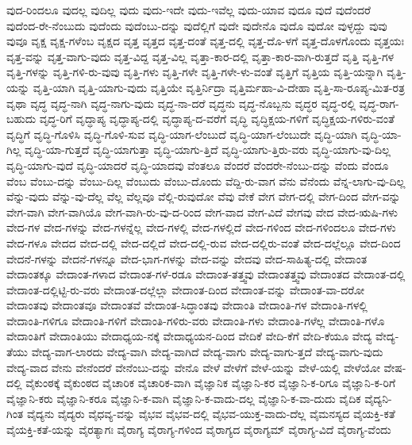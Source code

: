 {ವುದ-ರಿಂದಲೂ
ವುದಲ್ಲ
ವುದಿಲ್ಲ
ವುದು
ವುದು-ಇದೇ
ವುದು-ಇವೆಲ್ಲ
ವುದು-ಯಾವ
ವುದೂ
ವುದೆ
ವುದೆಂದರೆ
ವುದೆಂದ-ರೇ-ನೆಂಬುದು
ವುದೆಂದು
ವುದೆಂಬು-ದನ್ನು
ವುದೆಲ್ಲಿಗೆ
ವುದೇ
ವುದೇನೊ
ವುದೊ
ವುದೋ
ವುಳ್ಳದ್ದು
ವುವು
ವುವೂ
ವೃಕ್ಷ
ವೃಕ್ಷ-ಗಳೆಂಬ
ವೃಕ್ಷದ
ವೃತ್ತ
ವೃತ್ತದ
ವೃತ್ತ-ದಂತೆ
ವೃತ್ತ-ದಲ್ಲಿ
ವೃತ್ತ-ದೊ-ಳಗೆ
ವೃತ್ತ-ದೊಳಗೊಂದು
ವೃತ್ತಯಃ
ವೃತ್ತ-ವನ್ನು
ವೃತ್ತ-ವಾಗು-ವುದು
ವೃತ್ತ-ವಿದ್ದ
ವೃತ್ತ-ವಿಲ್ಲ
ವೃತ್ತಾ-ಕಾರ-ದಲ್ಲಿ
ವೃತ್ತಾ-ಕಾರ-ವಾಗಿ-ರುತ್ತದೆ
ವೃತ್ತಿ
ವೃತ್ತಿ-ಗಳ
ವೃತ್ತಿ-ಗಳನ್ನು
ವೃತ್ತಿ-ಗಳಿ-ರು-ವುವು
ವೃತ್ತಿ-ಗಳು
ವೃತ್ತಿ-ಗಳೇ
ವೃತ್ತಿ-ಗಳೇ-ಳು-ವಂತೆ
ವೃತ್ತಿಗೆ
ವೃತ್ತಿಯ
ವೃತ್ತಿ-ಯನ್ನಾಗಿ
ವೃತ್ತಿ-ಯನ್ನು
ವೃತ್ತಿ-ಯಾಗಿ
ವೃತ್ತಿ-ಯಾಗು-ವುದು
ವೃತ್ತಿಯೇ
ವೃತ್ತಿರ್ನಿದ್ರಾ
ವೃತ್ತಿರ್ಮಹಾ-ವಿ-ದೇಹಾ
ವೃತ್ತಿ-ಸಾ-ರೂಪ್ಯ-ಮಿತ-ರತ್ರ
ವೃಥಾ
ವೃದ್ಧ
ವೃದ್ಧ-ನಾಗಿ
ವೃದ್ಧ-ನಾಗು-ವುದು
ವೃದ್ಧ-ನಾ-ದರೆ
ವೃದ್ಧನು
ವೃದ್ಧ-ನೊಬ್ಬನು
ವೃದ್ಧರ
ವೃದ್ಧ-ರಲ್ಲಿ
ವೃದ್ಧ-ರಾಗ-ಬಹುದು
ವೃದ್ಧ-ರಿಗೆ
ವೃದ್ಧಾಪ್ಯ
ವೃದ್ಧಾಪ್ಯ-ದಲ್ಲಿ
ವೃದ್ಧಾಪ್ಯ-ದ-ವರೆಗೆ
ವೃದ್ಧಿ
ವೃದ್ಧಿಕ್ಷಯ-ಗಳಿಗೆ
ವೃದ್ಧಿಕ್ಷಯ-ಗಳಿರು-ವಂತೆ
ವೃದ್ಧಿಗೆ
ವೃದ್ಧಿ-ಗೊಳಿಸಿ
ವೃದ್ಧಿ-ಗೊಳಿ-ಸುವ
ವೃದ್ಧಿ-ಯಾಗ-ಲೆಂಬುದೆ
ವೃದ್ಧಿ-ಯಾಗ-ಲೆಂಬುದೇ
ವೃದ್ಧಿ-ಯಾಗಿ
ವೃದ್ಧಿ-ಯಾ-ಗಿಲ್ಲ
ವೃದ್ಧಿ-ಯಾ-ಗುತ್ತದೆ
ವೃದ್ಧಿ-ಯಾಗುತ್ತಾ
ವೃದ್ಧಿ-ಯಾಗು-ತ್ತಿದೆ
ವೃದ್ಧಿ-ಯಾಗು-ತ್ತಿರು-ವರು
ವೃದ್ಧಿ-ಯಾಗು-ವು-ದಿಲ್ಲ
ವೃದ್ಧಿ-ಯಾಗು-ವುದೆ
ವೃದ್ಧಿ-ಯಾದರೆ
ವೃದ್ಧಿ-ಯಾದವು
ವೆಂತಲೂ
ವೆಂದರೆ
ವೆಂದರೇ-ನೆಂಬು-ದನ್ನು
ವೆಂದು
ವೆಂದೂ
ವೆಂಬ
ವೆಂಬು-ದನ್ನು
ವೆಂಬು-ದಿಲ್ಲ
ವೆಂಬುದು
ವೆಂಬು-ದೊಂದು
ವೆದ್ದಿ-ರು-ವಾಗ
ವೆನು
ವೆನೆಂದು
ವೆನ್ನ-ಲಾಗು-ವು-ದಿಲ್ಲ
ವೆನ್ನು-ವುದು
ವೆನ್ನು-ವು-ದೆಲ್ಲ
ವೆಲ್ಲ
ವೆಲ್ಲವೂ
ವೆಲ್ಲಿ-ರುವುದೋ
ವೆವು
ವೇಕೆ
ವೇಗ
ವೇಗ-ದಲ್ಲಿ
ವೇಗ-ದಿಂದ
ವೇಗ-ವನ್ನು
ವೇಗ-ವಾಗಿ
ವೇಗ-ವಾಗಿಯೊ
ವೇಗ-ವಾಗಿ-ರು-ವು-ದ-ರಿಂದ
ವೇಗ-ವಾದ
ವೇಗ-ವಿದೆ
ವೇಗವು
ವೇದ
ವೇದ-ಋಷಿ-ಗಳು
ವೇದ-ಗಳ
ವೇದ-ಗಳನ್ನು
ವೇದ-ಗಳನ್ನೆಲ್ಲ
ವೇದ-ಗಳಲ್ಲಿ
ವೇದ-ಗಳಲ್ಲಿದೆ
ವೇದ-ಗಳಿಂದ
ವೇದ-ಗಳಿಂದಲೂ
ವೇದ-ಗಳು
ವೇದ-ಗಳೂ
ವೇದದ
ವೇದ-ದಲ್ಲಿ
ವೇದ-ದಲ್ಲಿದೆ
ವೇದ-ದಲ್ಲಿ-ರುವ
ವೇದ-ದಲ್ಲಿರು-ವಂತೆ
ವೇದ-ದಲ್ಲೆಲ್ಲೂ
ವೇದ-ದಿಂದ
ವೇದನೆ-ಗಳನ್ನು
ವೇದನೆ-ಗಳನ್ನೂ
ವೇದ-ಭಾಗ-ಗಳನ್ನು
ವೇದ-ವನ್ನು
ವೇದವು
ವೇದ-ಸಾಹಿತ್ಯ-ದಲ್ಲಿ
ವೇದಾಂತ
ವೇದಾಂತಕ್ಕೂ
ವೇದಾಂತ-ಗಳಾದ
ವೇದಾಂತ-ಗಳೆ-ರಡೂ
ವೇದಾಂತ-ತತ್ತ್ವವು
ವೇದಾಂತತ್ತ್ವವು
ವೇದಾಂತದ
ವೇದಾಂತ-ದಲ್ಲಿ
ವೇದಾಂತ-ದಲ್ಲಿಟ್ಟಿ-ರು-ವರು
ವೇದಾಂತ-ದಲ್ಲೆಲ್ಲಾ
ವೇದಾಂತ-ದಿಂದ
ವೇದಾಂತ-ವನ್ನು
ವೇದಾಂತ-ವಾ-ದರೋ
ವೇದಾಂತವು
ವೇದಾಂತವೂ
ವೇದಾಂತವೆ
ವೇದಾಂತ-ಸಿದ್ಧಾಂತವು
ವೇದಾಂತಿ
ವೇದಾಂತಿ-ಗಳ
ವೇದಾಂತಿ-ಗಳಲ್ಲಿ
ವೇದಾಂತಿ-ಗಳಿಗೂ
ವೇದಾಂತಿ-ಗಳಿಗೆ
ವೇದಾಂತಿ-ಗಳಿರು-ವರು
ವೇದಾಂತಿ-ಗಳು
ವೇದಾಂತಿ-ಗಳೆಲ್ಲ
ವೇದಾಂತಿ-ಗಳೊ
ವೇದಾಂತಿಗೆ
ವೇದಾಂತಿಯು
ವೇದಾಧ್ಯಯ-ನಕ್ಕೆ
ವೇದಾಧ್ಯಯನ-ದಿಂದ
ವೇದಿಕೆ
ವೇದಿ-ಕೆಗೆ
ವೇದಿ-ಕೆಯೂ
ವೇದ್ಯ
ವೇದ್ಯ-ತೆಯು
ವೇದ್ಯ-ವಾಗ-ಲಾರದು
ವೇದ್ಯ-ವಾಗಿ
ವೇದ್ಯ-ವಾಗಿದೆ
ವೇದ್ಯ-ವಾಗು
ವೇದ್ಯ-ವಾಗು-ತ್ತದೆ
ವೇದ್ಯ-ವಾಗು-ವುದು
ವೇದ್ಯ-ವಾದ
ವೇನು
ವೇನೆಂದರೆ
ವೇನೆಂಬು-ದನ್ನು
ವೇನೊ
ವೇಳೆ
ವೇಳೆಗೆ
ವೇಳೆ-ಯನ್ನು
ವೇಳೆ-ಯಲ್ಲಿ
ವೇಳೆಯೋ
ವೇಷ-ದಲ್ಲಿ
ವೈಕುಂಠಕ್ಕೆ
ವೈಕುಂಠದ
ವೈಚಾರಿಕ
ವೈಚಾರಿಕ-ವಾಗಿ
ವೈಜ್ಞಾನಿಕ
ವೈಜ್ಞಾನಿ-ಕರ
ವೈಜ್ಞಾನಿ-ಕ-ರಿಗೂ
ವೈಜ್ಞಾನಿ-ಕ-ರಿಗೆ
ವೈಜ್ಞಾನಿ-ಕರು
ವೈಜ್ಞಾನಿ-ಕರೂ
ವೈಜ್ಞಾನಿ-ಕ-ವಾಗಿ
ವೈಜ್ಞಾನಿ-ಕ-ವಾದು-ದಲ್ಲ
ವೈಜ್ಞಾನಿ-ಕ-ವಾ-ದುದು
ವೈದಿಕ
ವೈದ್ಯನಿ-ಗಿಂತ
ವೈದ್ಯನು
ವೈದ್ಯರು
ವೈಧವ್ಯ-ವನ್ನು
ವೈಭವ
ವೈಭವ-ದಲ್ಲಿ
ವೈಭವ-ಯುಕ್ತ-ವಾದು-ದೆಲ್ಲ
ವೈಮನಸ್ಯದ
ವೈಯಕ್ತಿ-ಕತೆ
ವೈಯಕ್ತಿ-ಕತೆ-ಯನ್ನು
ವೈರತ್ಯಾಗಃ
ವೈರಾಗ್ಯ
ವೈರಾಗ್ಯ-ಗಳಿಂದ
ವೈರಾಗ್ಯದ
ವೈರಾಗ್ಯಮ್
ವೈರಾಗ್ಯ-ವಿದೆ
ವೈರಾಗ್ಯ-ವೆಂದು
}
